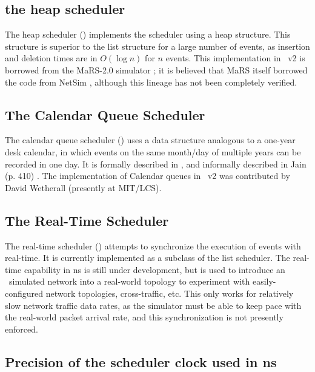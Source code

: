 \subsection{the heap scheduler}
\label{sec:heapsched}

The heap scheduler ()
implements the scheduler using a heap structure.
This structure is superior to the list structure for a large number
of events, as insertion and deletion times are in $O(\log n)$
for $n$ events.
This implementation in \ns~v2 is borrowed from the
MaRS-2.0 simulator \cite{Alae94:Design};
it is believed that MaRS itself borrowed the code
from NetSim \cite{Heyb89:Netsim},
although this lineage has not been completely verified.

\subsection{The Calendar Queue Scheduler}
\label{sec:cqsched}

The calendar queue scheduler
()
uses a data structure analogous to a one-year desk calendar,
in which events on the same month/day of multiple years can be recorded in
one day.
It is formally described in \cite{Brow88:Calendar}, and informally described
in Jain (p. 410) \cite{Jain91:Art}.
The implementation of Calendar queues in \ns~v2
was contributed by David Wetherall (presently at MIT/LCS).

\subsection{The Real-Time Scheduler}
\label{sec:rtsched}

The real-time scheduler ()
attempts to synchronize the execution of events with real-time.
It is currently implemented as a subclass of the list scheduler.
The real-time capability in ns is still under development, but is used
to introduce an \ns\ simulated network into a real-world topology
to experiment with easily-configured network topologies, cross-traffic, etc. 
This only works for relatively slow network traffic data rates, as the
simulator must be able to keep pace with the real-world packet arrival
rate, and this synchronization is not presently enforced.


\subsection{Precision of the scheduler clock used in ns}
\label{sec:precision}


